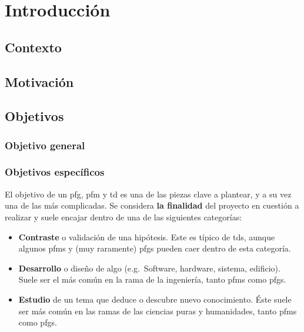 \chapter{Introducción}
\label{chapter:introduccion}


\section{Contexto}

\section{Motivación}

\section{Objetivos}

    \subsection{Objetivo general}

    \subsection{Objetivos específicos}
        El objetivo de un \gls{pfg}, \gls{pfm} y  \gls{td} es una de las piezas clave a plantear, y a su vez una de las más complicadas. Se considera \textbf{la finalidad} del proyecto en cuestión a realizar y suele encajar dentro de una de las siguientes categorías:

        \begin{itemize}
            \item \textbf{Contraste} o validación de una hipótesis. Este es típico de \glspl{td}, aunque algunos \glspl{pfm} y (muy raramente) \glspl{pfg} pueden caer dentro de esta categoría.
            \item \textbf{Desarrollo} o diseño de algo (e.g.~Software, hardware, sistema, edificio). Suele ser el más común en la rama de la ingeniería, tanto \glspl{pfm} como \glspl{pfg}.
            \item \textbf{Estudio} de un tema que deduce o descubre nuevo conocimiento. Éste suele ser más común en las ramas de las ciencias puras y humanidades, tanto \glspl{pfm} como \glspl{pfg}.
        \end{itemize}

